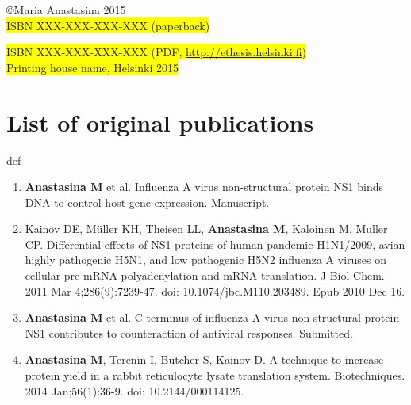 \documentclass[a4paper,12pt]{article} %
\providecommand{\phantomsection}{def} %
\begin{document}
\vspace{2 cm}

\copyright Maria Anastasina 2015 \\


\fboxsep=0pt\colorbox{yellow}{ISBN XXX-XXX-XXX-XXX (paperback)}

\fboxsep=0pt\colorbox{yellow}{ISBN XXX-XXX-XXX-XXX (PDF, \url{http://ethesis.helsinki.fi})}\\

\fboxsep=0pt\colorbox{yellow}{Printing house name, Helsinki 2015}


\newpage
\thispagestyle{empty}
\tableofcontents


\newpage
\thispagestyle{empty}
\section*{List of original publications}
\phantomsection %

	\begin{enumerate}[I]

	\item \textbf{Anastasina M} et al. Influenza A virus non-structural protein NS1 binds DNA to control host gene expression. Manuscript. \label{DNA}
	
	\item 	Kainov DE, Müller KH, Theisen LL, \textbf{Anastasina M}, Kaloinen M, Muller CP. Differential effects of NS1 proteins of human pandemic H1N1/2009, avian highly pathogenic H5N1, and low pathogenic H5N2 influenza A viruses on cellular pre-mRNA polyadenylation and mRNA translation. J Biol Chem. 2011 Mar 4;286(9):7239-47. doi: 10.1074/jbc.M110.203489. Epub 2010 Dec 16.\label{Transl}
	
	\item \textbf{Anastasina M} et al. C-terminus of influenza A virus non-structural protein NS1 contributes to counteraction of antiviral responses. Submitted.\label{Cterm}
	
	\item \textbf{Anastasina M}, Terenin I, Butcher S, Kainov D. A technique to increase protein yield in a rabbit reticulocyte lysate translation system. Biotechniques. 2014 Jan;56(1):36-9. doi: 10.2144/000114125. \label{RRL}
	
\end{enumerate}
\end{document}
